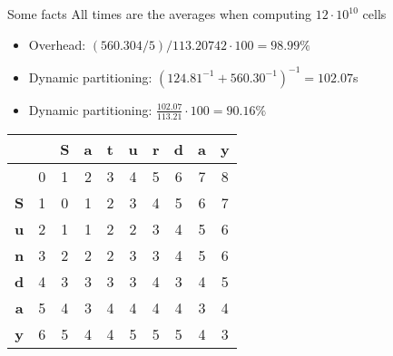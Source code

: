 \backupbegin
\begin{frame}
\end{frame}

\begin{frame}{Some facts}
    All times are the averages when computing $12\cdot10^{10}$ cells
    \begin{itemize}
        \item Overhead: $(560.304/5)/113.20742\cdot100=98.99\%$
        \item Dynamic partitioning: $(124.81^{-1}+560.30^{-1})^{-1}=102.07$s
        \item Dynamic partitioning: $\frac{102.07}{113.21}\cdot100=90.16\%$
    \end{itemize}
\end{frame}

\begin{frame}
    \begin{center}
\begin{tabular}{|c|c||c|c|c|c|c|c|c|c|}\hline
  &   & \textbf{S} & \textbf{a} & \textbf{t} & \textbf{u} & \textbf{r} & \textbf{d} & \textbf{a} & \textbf{y} \\\hline
  & 0 & 1 & 2 & 3 & 4 & 5 & 6 & 7 & 8 \\\hline\hline
\textbf{S} & 1 & 0 & 1 & 2 & 3 & 4 & 5 & 6 & 7 \\\hline
\textbf{u} & 2 & 1 & 1 & 2 & 2 & 3 & 4 & 5 & 6 \\\hline
\textbf{n} & 3 & 2 & 2 & 2 & 3 & 3 & 4 & 5 & 6 \\\hline
\textbf{d} & 4 & 3 & 3 & 3 & 3 & 4 & 3 & 4 & 5 \\\hline
\textbf{a} & 5 & 4 & 3 & 4 & 4 & 4 & 4 & 3 & 4 \\\hline
\textbf{y} & 6 & 5 & 4 & 4 & 5 & 5 & 5 & 4 & 3 \\\hline
    \end{tabular}
    \end{center}

\end{frame}


